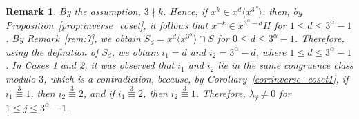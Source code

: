 \documentclass[12pt]{article}
\newtheorem{remA}[propA]{Remark}
\begin{document}
\begin{remA}
By the assumption, \(3\nmid k\). Hence, if \(x^k\in x^d\langle x^{3^\alpha}\rangle\), then, by Proposition~\ref{prop:inverse_coset}, it follows that \(x^{-k}\in x^{3^\alpha-d}H\) for \(1\leq d\leq3^\alpha-1\). By Remark~\ref{rem:7}, we obtain
$S_d = x^d \langle x^{3^\alpha} \rangle \cap S$ for
$0 \le d \le 3^\alpha - 1$. Therefore, using the definition of \(S_d\), we obtain \(i_1=d\) and \(i_2=3^\alpha-d\), where \(1\leq d\leq3^\alpha-1\). In Cases 1 and 2, it was observed that \(i_1\) and \(i_2\) lie in the same congruence class modulo \(3\), which is a contradiction, because, by Corollary~\ref{cor:inverse_coset1}, if \(i_1\stackrel{3}{\equiv}1\), then \(i_2\stackrel{3}{\equiv}2\), and if \(i_1\stackrel{3}{\equiv}2\), then \(i_2\stackrel{3}{\equiv}1\). Therefore, \(\lambda_j\neq0\) for \(1\leq j\leq3^\alpha-1\).
\end{remA}		
\end{document}
